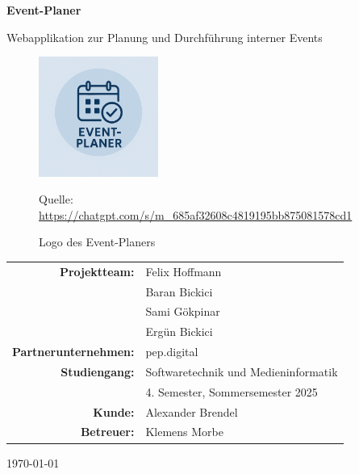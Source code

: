 \documentclass[a4paper,12pt]{article}
\begin{document}

\begin{titlepage}
    \centering

    \vspace*{1.5cm}

    {\LARGE\bfseries Event-Planer\par}
    \vspace{0.3cm}
    {\normalsize Webapplikation zur Planung und Durchführung interner Events\par}

    \vspace{0.5cm}

    \begin{figure}[H]
        \centering
        \includegraphics[width=0.35\textwidth]{Abbildungen/logo.png}
        \caption{Logo des Event-Planers}
        \label{fig:logo}
        {\footnotesize Quelle: \url{https://chatgpt.com/s/m_685af32608c4819195bb875081578cd1}}
    \end{figure}

    \vspace{1.2cm}

    {\normalsize
    \begin{tabular}{rl}
        \textbf{Projektteam:}      & Felix Hoffmann \\
                                   & Baran Bickici \\
                                   & Sami Gökpinar \\
                                   & Ergün Bickici \\[0.5em]
        \textbf{Partnerunternehmen:} & pep.digital \\[0.5em]
        \textbf{Studiengang:}      & Softwaretechnik und Medieninformatik \\
                                   & 4. Semester, Sommersemester 2025 \\[0.5em]
        \textbf{Kunde:}            & Alexander Brendel \\[0.5em]
        \textbf{Betreuer:}         & Klemens Morbe \\
    \end{tabular}
    }

    \vfill
    {\small \today}
\end{titlepage}
\end{document}
